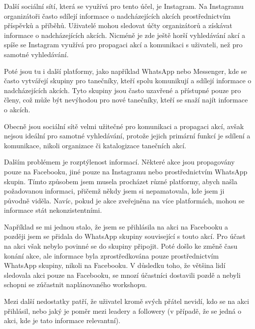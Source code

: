 Další sociální sítí, která se využívá pro tento účel, je Instagram. Na Instagramu organizátoři často sdílejí informace o nadcházejících akcích prostřednictvím příspěvků a příběhů. Uživatelé mohou sledovat účty organizátorů a získávat informace o nadcházejících akcích. Nicméně je zde ještě horší vyhledávání akcí a spíše se Instagram využívá pro propagaci akcí a komunikaci s uživateli, než pro samotné vyhledávání.

Poté jsou tu i další platformy, jako například WhatsApp nebo Messenger, kde se často vytvářejí skupiny pro tanečníky, kteří spolu komunikují a sdílejí informace o nadcházejících akcích. Tyto skupiny jsou často uzavřené a přístupné pouze pro členy, což může být nevýhodou pro nové tanečníky, kteří se snaží najít informace o akcích.

Obecně jsou sociální sítě velmi užitečné pro komunikaci a propagaci akcí, avšak nejsou ideální pro samotné vyhledávání, protože jejich primární funkcí je sdílení a komunikace, nikoli organizace či katalogizace tanečních akcí. 

Dalším problémem je rozptýlenost informací.
Některé akce jsou propagovány pouze na Facebooku, jiné pouze na Instagramu nebo prostřednictvím WhatsApp skupin. Tímto způsobem jsem musela procházet různé platformy, abych našla požadovanou informaci, přičemž někdy jsem si nepamatovala, kde jsem ji původně viděla. Navíc, pokud je akce zveřejněna na více platformách, mohou se informace stát nekonzistentními.

Například se mi jednou stalo, že jsem se přihlásila na akci na Facebooku a později jsem se přidala do WhatsApp skupiny související s touto akcí. Pro účast na akci však nebylo povinné se do skupiny připojit. Poté došlo ke změně času konání akce, ale informace byla zprostředkována pouze prostřednictvím WhatsApp skupiny, nikoli na Facebooku. V důsledku toho, že většina lidí sledovala akci pouze na Facebooku, se mnozí účastníci dostavili pozdě a nebyli schopni se zúčastnit naplánovaného workshopu.

Mezi další nedostatky patří, že uživatel kromě svých přátel nevidí, kdo se na akci přihlásil, nebo jaký je poměr mezi leadery a followery (v případě, že se jedná o akci, kde je tato informace relevantní).

